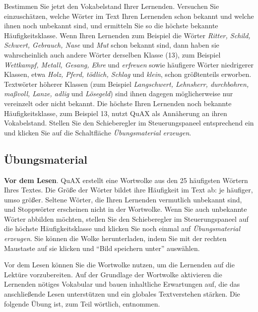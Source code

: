 \documentclass[11pt]{article}\usepackage[]{graphicx}\usepackage[]{color}
\begin{document}
Bestimmen Sie jetzt den Vokabelstand Ihrer Lernenden. Versuchen Sie einzuschätzen, welche Wörter im Text Ihren Lernenden schon bekannt und welche ihnen noch unbekannt sind, und ermitteln Sie so die höchste bekannte Häufigkeitsklasse. Wenn Ihren Lernenden zum Beispiel die Wörter \textit{Ritter, Schild, Schwert, Gebrauch, Nase} und \textit{Mut} schon bekannt sind, dann haben sie wahrscheinlich auch andere Wörter derselben Klasse (13), zum Beispiel \textit{Wettkampf, Metall, Gesang, Ehre} und \textit{erfreuen} sowie häufigere Wörter niedrigerer Klassen, etwa \textit{Holz, Pferd, tödlich, Schlag} und \textit{klein}, schon größtenteils erworben. Textwörter höherer Klassen (zum Beispiel \textit{Langschwert, Lehnsherr, durchbohren, maßvoll, Lanze, adlig} und \textit{Lösegeld}) sind ihnen dagegen möglicherweise nur vereinzelt oder nicht bekannt. Die höchste Ihren Lernenden noch bekannte Häufigkeitsklasse, zum Beispiel 13, nutzt QuAX als Annäherung an ihren Vokabelstand. Stellen Sie den Schieberegler im Steuerungspaneel entsprechend ein und klicken Sie auf die Schaltfläche \textit{Übungsmaterial erzeugen}. 

\subsection{Übungsmaterial}

\textbf{Vor dem Lesen}. QuAX erstellt eine Wortwolke aus den 25 häufigsten Wörtern Ihres Textes. Die Größe der Wörter bildet ihre Häufigkeit im Text ab: je häufiger, umso größer. Seltene Wörter, die Ihren Lernenden vermutlich unbekannt sind, und Stoppwörter erscheinen nicht in der Wortwolke. Wenn Sie auch unbekannte Wörter abbilden möchten, stellen Sie den Schieberegler im Steuerungspaneel auf die höchste Häufigkeitsklasse und klicken Sie noch einmal auf \textit{Übungsmaterial erzeugen}. Sie können die Wolke herunterladen, indem Sie mit der rechten Maustaste auf sie klicken und "`Bild speichern unter"' auswählen. 

Vor dem Lesen können Sie die Wortwolke nutzen, um die Lernenden auf die Lektüre vorzubereiten. Auf der Grundlage der Wortwolke aktivieren die Lernenden nötiges Vokabular und bauen inhaltliche Erwartungen auf, die das anschließende Lesen unterstützen und ein globales Textverstehen stärken. Die folgende Übung ist, zum Teil wörtlich, \citet[35]{Watkins.2017} entnommen.
\end{document}
